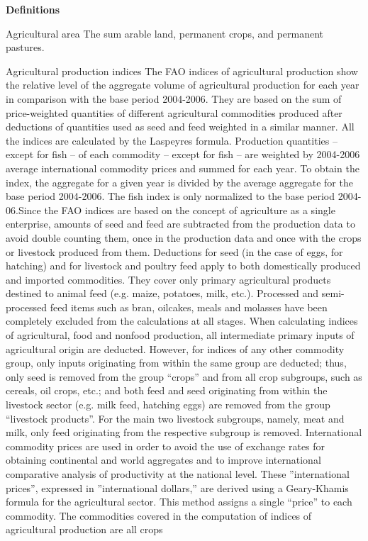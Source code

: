 \begin{MetadataCollection} {}

\twocolumn

\LARGE

\textbf{Definitions}

\footnotesize

\begin{metadata}{Agricultural area}{} {}
The sum arable land, permanent crops, and permanent pastures.
\end{metadata}

\begin{metadata}{Agricultural production indices} {}
The FAO indices of agricultural production show the relative level of the aggregate volume of agricultural production for each year in comparison with the base period 2004-2006. They are based on the sum of price-weighted quantities of different agricultural commodities produced after deductions of quantities used as seed and feed weighted in a similar manner. All the indices are calculated by the Laspeyres formula. Production quantities – except for fish – of each commodity – except for fish – are weighted by 2004-2006 average international commodity prices and summed for each year. To obtain the index, the aggregate for a given year is divided by the average aggregate for the base period 2004-2006. The fish index is only normalized to the base period 2004-06.Since the FAO indices are based on the concept of agriculture as a single enterprise, amounts of seed and feed are subtracted from the production data to avoid double counting them, once in the production data and once with the crops or livestock produced from them. Deductions for seed (in the case of eggs, for hatching) and for livestock and poultry feed apply to both domestically produced and imported commodities. They cover only primary agricultural products destined to animal feed (e.g. maize, potatoes, milk, etc.). Processed and semi-processed feed items such as bran, oilcakes, meals and molasses have been completely excluded from the calculations at all stages. When calculating indices of agricultural, food and nonfood production, all intermediate primary inputs of agricultural origin are deducted. However, for indices of any other commodity group, only inputs originating from within the same group are deducted; thus, only seed is removed from the group “crops” and from all crop subgroups, such as cereals, oil crops, etc.; and both feed and seed originating from within the livestock sector (e.g. milk feed, hatching eggs) are removed from the group “livestock products”. For the main two livestock subgroups, namely, meat and milk, only feed originating from the respective subgroup is removed. International commodity prices are used in order to avoid the use of exchange rates for obtaining continental and world aggregates and to improve international comparative analysis of productivity at the national level. These ”international prices”, expressed in ”international dollars,” are derived using a Geary-Khamis formula for the agricultural sector. This method assigns a single “price” to each commodity. The commodities covered in the computation of indices of agricultural production are all crops 
\end{metadata}
\end{MetadataCollection}
